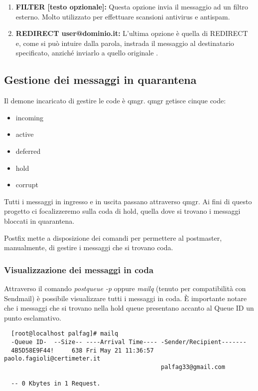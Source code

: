 \begin{table}[htp]
\begin{enumerate}[label=\textbf{\arabic*})]
      \item{\textbf{FILTER [testo opzionale]:}}
      Questa opzione invia il messaggio ad un filtro esterno. Molto utilizzato per effettuare scansioni 
      antivirus e antispam.
      
      \item{\textbf{REDIRECT user@dominio.it:}} 
      L'ultima opzione è quella di REDIRECT e, come si può intuire dalla parola, instrada il messaggio al 
      destinatario specificato, anziché inviarlo a quello originale \cite{hildebrandt2005book}.
  \end{enumerate}
  \end{table}
  
  \pagebreak
  \begin{table}[htp]
    \subsection{Gestione dei messaggi in quarantena}
    Il demone incaricato di gestire le code è qmgr. qmgr getisce cinque code:
    \begin{itemize}
      \item incoming
      \item active
      \item deferred
      \item hold
      \item corrupt
    \end{itemize}
  \end{table}
  
  Tutti i messaggi in ingresso e in uscita passano attraverso qmgr. Ai fini di questo progetto ci focalizzeremo
  sulla coda di hold, quella dove si trovano i messaggi bloccati in quarantena.
  
  Postfix mette a disposizione dei comandi per permettere al postmaster, manualmente, di gestire i messaggi che si 
  trovano coda.
  
  \subsubsection{Visualizzazione dei messaggi in coda}
  Attraverso il comando \textit{postqueue -p} oppure \textit{mailq} (tenuto per compatibilità con Sendmail) è possibile visualizzare tutti
  i messaggi in coda. È importante notare che i messaggi che si trovano nella hold queue presentano accanto al Queue ID 
  un punto esclamativo.
  
  \begin{verbatim}
  [root@localhost palfag]# mailq
  -Queue ID-  --Size-- ----Arrival Time---- -Sender/Recipient-------
  4B5D58E9F44!     638 Fri May 21 11:36:57  paolo.fagioli@certimeter.it
                                            palfag33@gmail.com
  
  -- 0 Kbytes in 1 Request.
  \end{verbatim}
  
